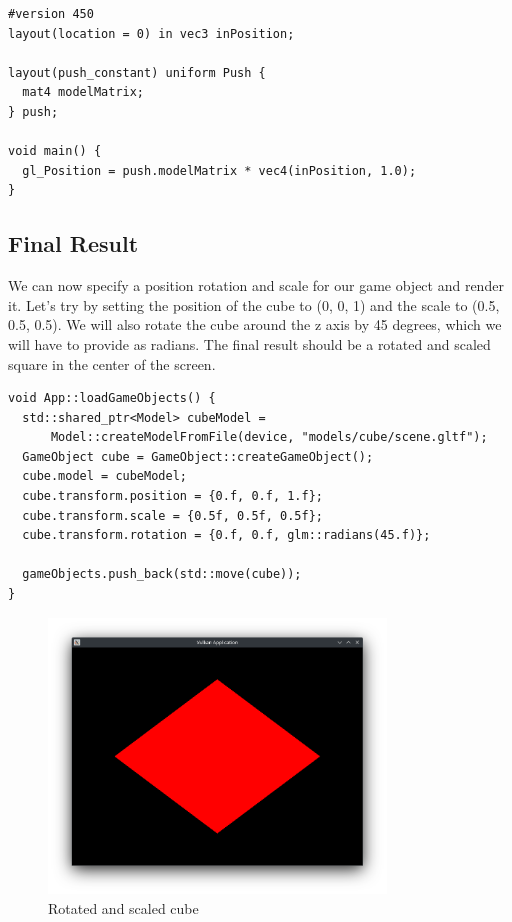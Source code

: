\documentclass[12pt]{report} \usepackage{preamble}
\begin{document}
\begin{lstlisting}[Language=C++]
#version 450
layout(location = 0) in vec3 inPosition;

layout(push_constant) uniform Push {
  mat4 modelMatrix;
} push;

void main() {
  gl_Position = push.modelMatrix * vec4(inPosition, 1.0);
}
\end{lstlisting}

\subsection{Final Result}

We can now specify a position rotation and scale for our game object and render it. Let's try by setting the position of the cube to (0, 0, 1) and the scale to (0.5, 0.5, 0.5).
We will also rotate the cube around the z axis by 45 degrees, which we will have to provide as radians. The final result should be a rotated and scaled square in the center of the screen.

\begin{lstlisting}[Language=C++]
void App::loadGameObjects() {
  std::shared_ptr<Model> cubeModel =
      Model::createModelFromFile(device, "models/cube/scene.gltf");
  GameObject cube = GameObject::createGameObject();
  cube.model = cubeModel;
  cube.transform.position = {0.f, 0.f, 1.f};
  cube.transform.scale = {0.5f, 0.5f, 0.5f};
  cube.transform.rotation = {0.f, 0.f, glm::radians(45.f)};

  gameObjects.push_back(std::move(cube));
}
\end{lstlisting}

\begin{figure}[htbp]
	\centering
	\includegraphics[width=0.8\textwidth]{images/rotated_cube.png}
	\caption{Rotated and scaled cube}
\end{figure}
\end{document}
